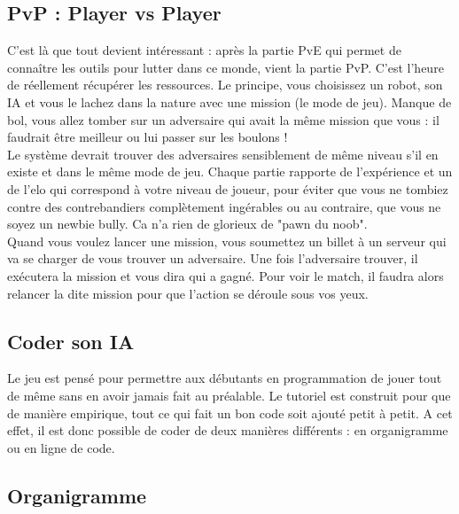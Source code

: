 \documentclass[10pt]{article}
\begin{document}
\subsection{PvP : Player vs Player}

C'est là que tout devient intéressant :  après la partie PvE qui permet de connaître les outils pour lutter dans ce monde, vient la partie PvP. C'est l'heure de réellement récupérer les ressources. Le principe, vous choisissez un robot, son IA et vous le lachez dans la nature avec une mission (le mode de jeu). Manque de bol, vous allez tomber sur un adversaire qui avait la même mission que vous : il faudrait être meilleur ou lui passer sur les boulons ! \\
Le système devrait trouver des adversaires sensiblement de même niveau s'il en existe et dans le même mode de jeu. Chaque partie rapporte de l'expérience et un de l'elo qui correspond à votre niveau de joueur, pour éviter que vous ne tombiez contre des contrebandiers complètement ingérables ou au contraire, que vous ne soyez un newbie bully. Ca n'a rien de glorieux de "pawn du noob".\\
Quand vous voulez lancer une mission, vous soumettez un billet à un serveur qui va se charger de vous trouver un adversaire. Une fois l'adversaire trouver, il exécutera la mission et vous dira qui a gagné. Pour voir le match, il faudra alors relancer la dite mission pour que l'action se déroule sous vos yeux. 
 
\subsection{Coder son IA}

Le jeu est pensé pour permettre aux débutants en programmation de jouer tout de même sans en avoir jamais fait au préalable. Le tutoriel est construit pour que de manière empirique, tout ce qui fait un bon code soit ajouté petit à petit. A cet effet, il est donc possible de coder de deux manières différents : en organigramme ou en ligne de code.

\subsection*{Organigramme}
\end{document}
